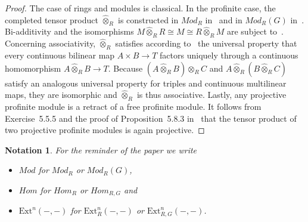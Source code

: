 \documentclass[12pt, a4paper]{article}
\numberwithin{equation}{section}
\newtheorem{notn}[thm]{Notation}
\theoremstyle{empty}
\theoremstyle{nonumberplain}
\newtheorem{proof}{Proof}
\begin{document}
\begin{proof}
The case of rings and modules is classical. In the profinite case, the completed tensor product $\widehat{\otimes}_R$ is constructed in $Mod_R$ in~\cite[Section~5.5]{rib10} and in $Mod_R(G)$ in~\cite[Section~5.8]{rib10}. Bi-additivity and the isomorphisms $M \widehat{\otimes}_R R \cong M \cong R \widehat{\otimes}_R M$ are subject to~\cite[Proposition~5.5.3]{rib10}. Concerning associativity, $\widehat{\otimes}_R$ satisfies according to~\cite[p.~177]{rib10} the universal property that every continuous bilinear map $A \times B \rightarrow T$ factors uniquely through a continuous homomorphism $A \widehat{\otimes}_R B \rightarrow T$. Because $(A \widehat{\otimes}_R B) \widehat{\otimes}_R C$ and $A \widehat{\otimes}_R (B \widehat{\otimes}_R C)$ satisfy an analogous universal property for triples and continuous multilinear maps, they are isomorphic and $\widehat{\otimes}_R$ is thus associative. Lastly, any projective profinite module is a retract of a free profinite module. It follows from Exercise~5.5.5 and the proof of Proposition~5.8.3 in~\cite{rib10} that the tensor product of two projective profinite modules is again projective.
\end{proof}

\begin{notn}
For the reminder of the paper we write
\begin{itemize}
\item $Mod$ for $Mod_R$ or $Mod_{R}(G)$,
\item $Hom$ for $Hom_R$ or $Hom_{R, G}$ and
\item $\mathrm{Ext}^n(-, -)$ for $\mathrm{Ext}_R^n(-, -)$ or $\mathrm{Ext}_{R, G}^n(-, -)$.
\end{itemize}
\end{notn}
\end{document}
